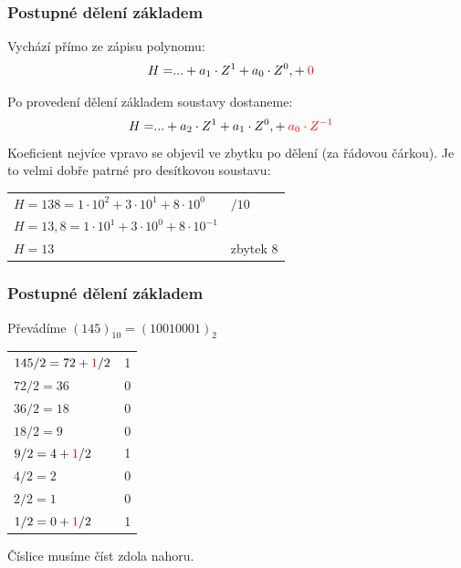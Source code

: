   \begin{frame}
    \frametitle{Postupné dělení základem}

    Vychází přímo ze zápisu polynomu:
      \small
			\boldmath
			\begin{align*}
			H =& ... + a_{1} \cdot Z^1 + a_{0} \cdot Z^0, + \:\textcolor{red}{0}
			\end{align*}
		
		Po provedení dělení základem soustavy dostaneme:
      \small
			\boldmath
			\begin{align*}
			H =& ... + a_{2} \cdot Z^1 + a_{1} \cdot Z^0, + \:\textcolor{red}{a_{0} \cdot Z^{-1}}
			\end{align*}
      \normalsize
    Koeficient nejvíce vpravo se objevil ve zbytku po dělení (za řádovou čárkou). Je to velmi dobře patrné pro desítkovou soustavu:
      \small
    	\begin{center}
        \begin{tabular}{p{70mm} | p{20mm}}
        $H = 138 = 1 \cdot 10^2 + 3 \cdot 10^1 + 8 \cdot 10^0$ & $/10$ \\
        $H = 13,8 = 1 \cdot 10^1 + 3 \cdot 10^0 + 8 \cdot 10^{-1}$ & \\
        $H = 13$ & zbytek $8$
        \end{tabular}
      \end{center}
	\end{frame}
  
  \begin{frame}
    \frametitle{Postupné dělení základem}
    \boldmath
    Převádíme $(145)_{10}=(10010001)_{2}$

		\begin{center}
      \begin{tabular}{p{60mm} | p{15mm}}
        $145 / 2 = 72 + \textcolor{red}{1}/2$ & 1 \\
        $72 / 2 = 36$ & 0 \\
        $36 / 2 = 18$ & 0 \\
        $18 / 2 = 9$ & 0 \\
        $9 / 2 = 4 + \textcolor{red}{1}/2$ & 1 \\
        $4 / 2 = 2$ & 0 \\
        $2 / 2 = 1$ & 0 \\
        $1 / 2 = 0 + \textcolor{red}{1}/2$ & 1 \\
      \end{tabular}
    \end{center}
    Číslice musíme číst zdola nahoru.
	\end{frame}
	
